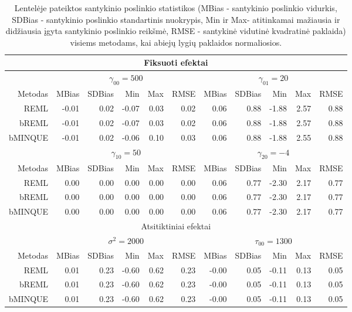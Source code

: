 \documentclass[12pt,a4paper]{article}
\begin{document}
\begin{small}
\begin{table}[ht]
\label{table:y1}
\centering
\begin{tabular}{r|rrrrr|rrrrr|}
\hline
\multicolumn{11}{c}{Fiksuoti efektai}\\
\hline
& \multicolumn{5}{c|}{$\gamma_{00} = 500$}&\multicolumn{5}{c|}{$\gamma_{01} = 20$}\\
\hline
Metodas & MBias & SDBias & Min & Max & RMSE & MBias & SDBias & Min & Max & RMSE\\
\hline
REML & -0.01 & 0.02 & -0.07 & 0.03 & 0.02& 0.06 & 0.88 & -1.88 & 2.57 & 0.88 \\
bREML & -0.01 & 0.02 & -0.07 & 0.03 & 0.02& 0.06 & 0.88 & -1.88 & 2.57 & 0.88 \\
bMINQUE & -0.01 & 0.02 & -0.06 & 0.10 & 0.03& 0.06 & 0.88 & -1.88 & 2.55 & 0.88\\
\hline
& \multicolumn{5}{c|}{$\gamma_{10} = 50$}&\multicolumn{5}{c|}{$\gamma_{20} = -4$}\\
\hline
Metodas & MBias & SDBias & Min & Max & RMSE & MBias & SDBias & Min & Max & RMSE\\
\hline
REML & 0.00 & 0.00 & 0.00 & 0.00 & 0.00& 0.06 & 0.77 & -2.30 & 2.17 & 0.77\\
bREML &0.00 & 0.00 & 0.00 & 0.00 & 0.00& 0.06 & 0.77 & -2.30 & 2.17 & 0.77\\
bMINQUE &0.00 & 0.00 & 0.00 & 0.00 & 0.00& 0.06 & 0.77 & -2.30 & 2.17 & 0.77\\
\hline
\multicolumn{11}{c}{Atsitiktiniai efektai}\\
\hline
& \multicolumn{5}{c|}{$\sigma^2=2000$}&\multicolumn{5}{c|}{$\tau_{00}=1300$}\\
\hline
Metodas & MBias & SDBias & Min & Max & RMSE & MBias & SDBias & Min & Max & RMSE\\
\hline
REML &0.01 & 0.23 & -0.60 & 0.62 & 0.23& -0.00 & 0.05 & -0.11 & 0.13 & 0.05\\
bREML & 0.01 & 0.23 & -0.60 & 0.62 & 0.23& -0.00 & 0.05 & -0.11 & 0.13 & 0.05\\
bMINQUE & 0.01 & 0.23 & -0.60 & 0.62 & 0.23& -0.00 & 0.05 & -0.11 & 0.13 & 0.05\\
\hline
\end{tabular}
\caption{Lentelėje pateiktos santykinio poslinkio statistikos (MBias - santykinio poslinkio vidurkis, SDBias - santykinio poslinkio standartinis nuokrypis, Min ir Max- atitinkamai mažiausia ir didžiausia įgyta santykinio poslinkio reikšmė, RMSE - santykinė vidutinė kvadratinė paklaida) visiems metodams, kai abiejų lygių paklaidos normaliosios.}
\end{table}
\end{small}
\end{document}
